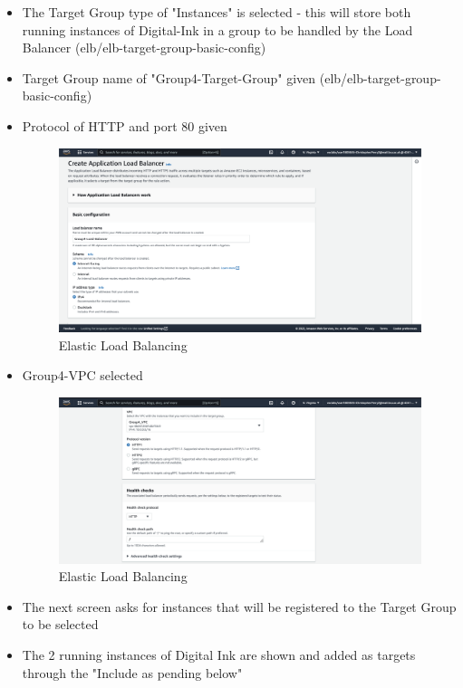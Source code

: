 \begin{itemize}
	\item The Target Group type of "Instances" is selected - this will store both running instances of Digital-Ink in a group
	      to be handled by the Load Balancer (elb/elb-target-group-basic-config)
	\item Target Group name of "Group4-Target-Group" given (elb/elb-target-group-basic-config)
	\item Protocol of HTTP and port 80 given \begin{figure}
	      \centering
	      \includegraphics[width=\textwidth]{resources/elb/elb-basic-config.png}
	      \caption{Elastic Load Balancing}
	      \label{fig:elb-basic-config}
	\end{figure}
	\item Group4-VPC selected \begin{figure}
	      \centering
	      \includegraphics[width=\textwidth]{resources/elb/elb-vpc.png}
	      \caption{Elastic Load Balancing}
	      \label{fig:elb-vpc}
	\end{figure}
	\item The next screen asks for instances that will be registered to the Target Group to be selected
	\item The 2 running instances of Digital Ink are shown and added as targets through the "Include as pending below"

\end{itemize}
